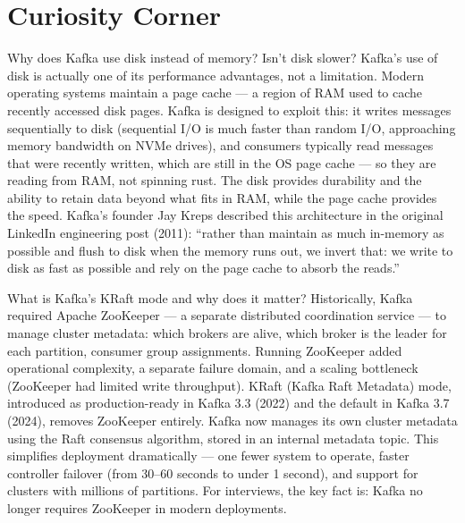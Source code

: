 \documentclass[11pt,a4paper]{article}
\begin{document}
\section{Curiosity Corner}

\begin{curiobox}{Why does Kafka use disk instead of memory? Isn't disk slower?}
Kafka's use of disk is actually one of its performance advantages, not a limitation. Modern operating systems maintain a page cache --- a region of RAM used to cache recently accessed disk pages. Kafka is designed to exploit this: it writes messages sequentially to disk (sequential I/O is much faster than random I/O, approaching memory bandwidth on NVMe drives), and consumers typically read messages that were recently written, which are still in the OS page cache --- so they are reading from RAM, not spinning rust. The disk provides durability and the ability to retain data beyond what fits in RAM, while the page cache provides the speed. Kafka's founder Jay Kreps described this architecture in the original LinkedIn engineering post (2011): ``rather than maintain as much in-memory as possible and flush to disk when the memory runs out, we invert that: we write to disk as fast as possible and rely on the page cache to absorb the reads.''
\end{curiobox}

\begin{curiobox}{What is Kafka's KRaft mode and why does it matter?}
Historically, Kafka required Apache ZooKeeper --- a separate distributed coordination service --- to manage cluster metadata: which brokers are alive, which broker is the leader for each partition, consumer group assignments. Running ZooKeeper added operational complexity, a separate failure domain, and a scaling bottleneck (ZooKeeper had limited write throughput). KRaft (Kafka Raft Metadata) mode, introduced as production-ready in Kafka 3.3 (2022) and the default in Kafka 3.7 (2024), removes ZooKeeper entirely. Kafka now manages its own cluster metadata using the Raft consensus algorithm, stored in an internal metadata topic. This simplifies deployment dramatically --- one fewer system to operate, faster controller failover (from 30--60 seconds to under 1 second), and support for clusters with millions of partitions. For interviews, the key fact is: Kafka no longer requires ZooKeeper in modern deployments.
\end{curiobox}
\end{document}
